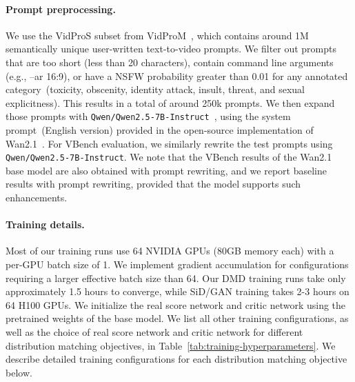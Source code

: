 \paragraph{Prompt preprocessing.} We use the VidProS subset from VidProM~\cite{wangvidprom}, which contains around 1M semantically unique user-written text-to-video prompts. We filter out prompts that are too short (less than 20 characters), contain command line arguments (e.g., --ar 16:9), or have a NSFW probability greater than 0.01 for any annotated category~(toxicity, obscenity, identity attack, insult, threat, and sexual explicitness). This results in a total of around 250k prompts. We then expand those prompts with \texttt{Qwen/Qwen2.5-7B-Instruct}~\cite{yang2024qwen2}, using the system prompt~(English version) provided in the open-source implementation of Wan2.1~\cite{wang2025wan}. For VBench evaluation, we similarly rewrite the test prompts using \texttt{Qwen/Qwen2.5-7B-Instruct}.
We note that the VBench results of the Wan2.1 base model are also obtained with prompt rewriting, and we report baseline results with prompt rewriting, provided that the model supports such enhancements.

\paragraph{Training details.}
Most of our training runs use 64 NVIDIA GPUs (80GB memory each) with a per-GPU batch size of 1. We implement gradient accumulation for configurations requiring a larger effective batch size than 64. Our DMD training runs take only approximately 1.5 hours to converge, while SiD/GAN training takes 2-3 hours on 64 H100 GPUs.
We initialize the real score network and critic network using the pretrained weights of the base model.
We list all other training configurations, as well as the choice of real score network and critic network for different distribution matching objectives, in Table~\ref{tab:training-hyperparameters}. We describe detailed training configurations for each distribution matching objective below.

